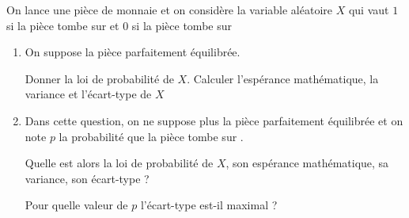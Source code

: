 
%
On lance une pièce de monnaie et on considère la variable aléatoire $X$ qui vaut $1$ si la pièce tombe sur \ogpile\fg{} et $0$ si la pièce tombe sur \ogface\fg{}
\begin{enumerate}
     \item
     On suppose la pièce parfaitement équilibrée.
     \par
     Donner la loi de probabilité de $X$. Calculer l'espérance mathématique, la variance et l'écart-type de $X$
     \item
     Dans cette question, on ne suppose plus la pièce parfaitement équilibrée et on note $p$ la probabilité que la pièce tombe sur \ogpile\fg{}.
     \par
     Quelle est alors la loi de probabilité de $X$, son espérance mathématique, sa variance, son écart-type ?
     \par
     Pour quelle valeur de $p$ l'écart-type est-il maximal ?
\end{enumerate}
